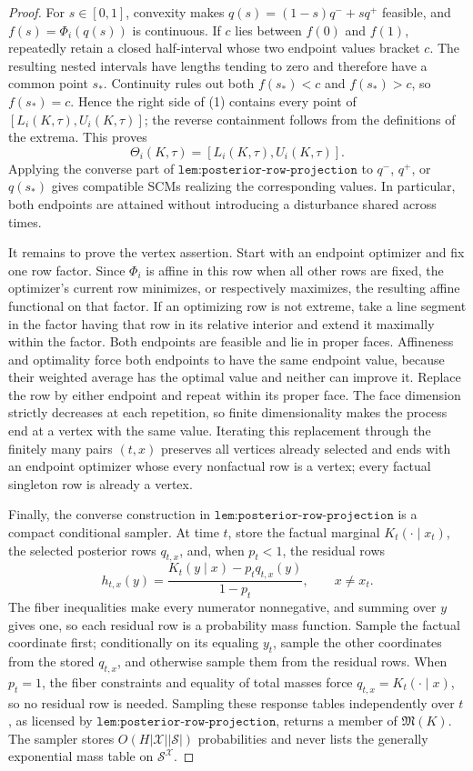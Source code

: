 \documentclass{article}
\begin{document}
\begin{proof}
For \(s\in[0,1]\), convexity makes \(q(s)=(1-s)q^-+sq^+\) feasible, and \(f(s)=\Phi_i(q(s))\) is continuous.  If \(c\) lies between \(f(0)\) and \(f(1)\), repeatedly retain a closed half-interval whose two endpoint values bracket \(c\).  The resulting nested intervals have lengths tending to zero and therefore have a common point \(s_*\).  Continuity rules out both \(f(s_*)<c\) and \(f(s_*)>c\), so \(f(s_*)=c\).  Hence the right side of (1) contains every point of \([L_i(K,\tau),U_i(K,\tau)]\); the reverse containment follows from the definitions of the extrema.  This proves
\[
 \Theta_i(K,\tau)=[L_i(K,\tau),U_i(K,\tau)].
\]
Applying the converse part of \(\texttt{lem:posterior-row-projection}\) to \(q^-\), \(q^+\), or \(q(s_*)\) gives compatible SCMs realizing the corresponding values.  In particular, both endpoints are attained without introducing a disturbance shared across times.

It remains to prove the vertex assertion.  Start with an endpoint optimizer and fix one row factor.  Since \(\Phi_i\) is affine in this row when all other rows are fixed, the optimizer's current row minimizes, or respectively maximizes, the resulting affine functional on that factor.  If an optimizing row is not extreme, take a line segment in the factor having that row in its relative interior and extend it maximally within the factor.  Both endpoints are feasible and lie in proper faces.  Affineness and optimality force both endpoints to have the same endpoint value, because their weighted average has the optimal value and neither can improve it.  Replace the row by either endpoint and repeat within its proper face.  The face dimension strictly decreases at each repetition, so finite dimensionality makes the process end at a vertex with the same value.  Iterating this replacement through the finitely many pairs \((t,x)\) preserves all vertices already selected and ends with an endpoint optimizer whose every nonfactual row is a vertex; every factual singleton row is already a vertex.

Finally, the converse construction in \(\texttt{lem:posterior-row-projection}\) is a compact conditional sampler.  At time \(t\), store the factual marginal \(K_t(\cdot\mid x_t)\), the selected posterior rows \(q_{t,x}\), and, when \(p_t<1\), the residual rows
\[
 h_{t,x}(y)=\frac{K_t(y\mid x)-p_tq_{t,x}(y)}{1-p_t},
 \qquad x\ne x_t.
\]
The fiber inequalities make every numerator nonnegative, and summing over \(y\) gives one, so each residual row is a probability mass function.  Sample the factual coordinate first; conditionally on its equaling \(y_t\), sample the other coordinates from the stored \(q_{t,x}\), and otherwise sample them from the residual rows.  When \(p_t=1\), the fiber constraints and equality of total masses force \(q_{t,x}=K_t(\cdot\mid x)\), so no residual row is needed.  Sampling these response tables independently over \(t\), as licensed by \(\texttt{lem:posterior-row-projection}\), returns a member of \(\mathfrak M(K)\).  The sampler stores \(O(H|\mathcal X||\mathcal S|)\) probabilities and never lists the generally exponential mass table on \(\mathcal S^{\mathcal X}\).
\end{proof}
\end{document}
